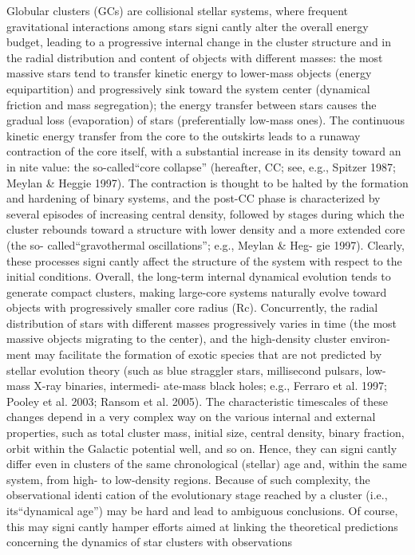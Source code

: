 \documentclass[../main.tex]{subfiles}
\begin{document}
{Globular clusters (GCs) are collisional stellar systems, where
frequent gravitational interactions among stars signi cantly
alter the overall energy budget, leading to a progressive internal
change in the cluster structure and in the radial distribution and
content of objects with different masses: the most massive stars
tend to transfer kinetic energy to lower-mass objects (energy
equipartition) and progressively sink toward the system center
(dynamical friction and mass segregation); the energy transfer
between stars causes the gradual loss (evaporation) of stars
(preferentially low-mass ones). The continuous kinetic energy
transfer from the core to the outskirts leads to a runaway
contraction of the core itself, with a substantial increase in its
density toward an in nite value: the so-called“core collapse”
(hereafter, CC; see, e.g., Spitzer 1987; Meylan & Heggie 1997).
The contraction is thought to be halted by the formation and
hardening of binary systems, and the post-CC phase is
characterized by several episodes of increasing central density,
followed by stages during which the cluster rebounds toward a
structure with lower density and a more extended core (the so-
called“gravothermal oscillations”; e.g., Meylan & Heg-
gie 1997). Clearly, these processes signi cantly affect the
structure of the system with respect to the initial conditions.
Overall, the long-term internal dynamical evolution tends to
generate compact clusters, making large-core systems naturally
evolve toward objects with progressively smaller core radius
(Rc). Concurrently, the radial distribution of stars with different
masses progressively varies in time (the most massive objects migrating to the center), and the high-density cluster environ-
ment may facilitate the formation of exotic species that are not
predicted by stellar evolution theory (such as blue straggler
stars, millisecond pulsars, low-mass X-ray binaries, intermedi-
ate-mass black holes; e.g., Ferraro et al. 1997; Pooley et al.
2003; Ransom et al. 2005).
The characteristic timescales of these changes depend in a
very complex way on the various internal and external
properties, such as total cluster mass, initial size, central
density, binary fraction, orbit within the Galactic potential well,
and so on. Hence, they can signi cantly differ even in clusters
of the same chronological (stellar) age and, within the same
system, from high- to low-density regions. Because of such
complexity, the observational identi cation of the evolutionary
stage reached by a cluster (i.e., its“dynamical age”) may be
hard and lead to ambiguous conclusions. Of course, this may
signi cantly hamper efforts aimed at linking the theoretical
predictions concerning the dynamics of star clusters with
observations

}
\end{document}
